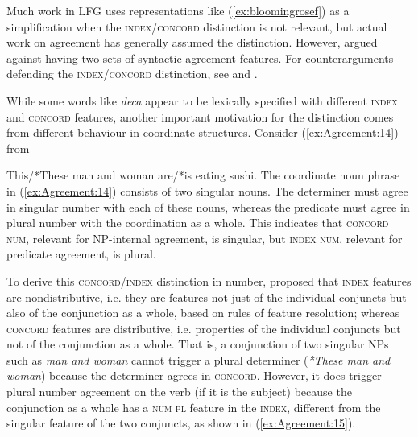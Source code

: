 \documentclass[output=paper,hidelinks]{langscibook}
\begin{document}
Much work in LFG uses representations like (\ref{ex:bloomingrosef}) as
a simplification when the \textsc{index/concord} distinction is not
relevant, but actual work on agreement has generally assumed the
distinction. However, \textcite{Alsina:Two,Alsina:Third} argued
against having two sets of syntactic agreement features. For
counterarguments defending the \textsc{index/concord} distinction, see
\textcite{Wechsler:Wrong} and \textcite{Hristov:LFG13}.

While some words like \textit{deca} appear to be lexically specified
with dif\-ferent \textsc{index} and \textsc{concord} features, another
important motivation for the distinction comes from different
behaviour in coordinate structures. Consider (\ref{ex:Agreement:14}) from \citet[36]{belyaev-etal2015}

\ea\label{ex:Agreement:14}
This/*These man and woman are/*is eating sushi.
\z
The coordinate noun phrase in (\ref{ex:Agreement:14}) consists of two singular
nouns. The determiner must agree in singular number with each of these
nouns, whereas the predicate must agree in plural number with the
coordination as a whole. This indicates that \textsc{concord num},
relevant for NP-internal agreement, is singular, but \textsc{index
  num}, relevant for predicate agreement, is plural.

To derive this \textsc{concord/index} distinction in number,
\textcite{kingdalrymple04} proposed that \textsc{index} features are
nondistributive, i.e. they are features not just of the individual
conjuncts but also of the conjunction as a whole, based on rules of
feature resolution; whereas \textsc{concord} features are
distributive, i.e. properties of the individual conjuncts but not of
the conjunction as a whole. That is, a conjunction of two singular NPs
such as \textit{man and woman} cannot trigger a plural determiner
(\textit{*These man and woman}) because the determiner agrees in
\textsc{concord}.  However, it does trigger plural number agreement on the
verb (if it is the subject) because the conjunction as a whole has a
\textsc{num pl} feature in the \textsc{index}, different from the
singular feature of the two conjuncts, as shown in (\ref{ex:Agreement:15}).
\end{document}
